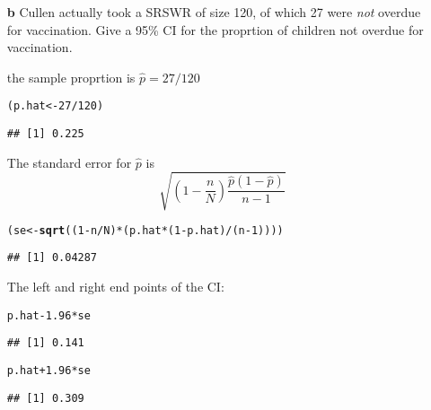 \documentclass{article}\usepackage{graphicx, color}
\makeatletter
\newcommand{\hlfunctioncall}[1]{\textcolor[rgb]{0.501960784313725,0,0.329411764705882}{\textbf{#1}}}%
\newenvironment{kframe}{%
 \def\at@end@of@kframe{}%
 \ifinner\ifhmode%
  \def\at@end@of@kframe{\end{minipage}}%
  \begin{minipage}{\columnwidth}%
 \fi\fi%
 \def\FrameCommand##1{\hskip\@totalleftmargin \hskip-\fboxsep
 \colorbox{shadecolor}{##1}\hskip-\fboxsep
     \hskip-\linewidth \hskip-\@totalleftmargin \hskip\columnwidth}%
 \MakeFramed {\advance\hsize-\width
   \@totalleftmargin\z@ \linewidth\hsize
   \@setminipage}}%
 {\par\unskip\endMakeFramed%
 \at@end@of@kframe}
\newenvironment{knitrout}{}{} %
\makeatother
\begin{document}
\begin{enumerate}
\begin{shaded}
\end{shaded}
\vfil
\pagebreak
\item[{\bf b}] Cullen actually took a SRSWR of size 120, of which
27 were {\sl not} overdue for vaccination. Give a 95\% CI for the
proprtion of children not overdue for vaccination.
\begin{shaded}
the sample proprtion is $\hat{p} = 27/120$
\begin{knitrout}
\color{fgcolor}\begin{kframe}
\begin{alltt}
(p.hat <- 27/120)
\end{alltt}
\begin{verbatim}
## [1] 0.225
\end{verbatim}
\end{kframe}
\end{knitrout}

The standard error for $\hat{p}$ is
$$
\sqrt{\left(1 - \frac{n}{N}\right)\frac{\hat{p}(1 - \hat{p})}{n-1}}
$$
\begin{knitrout}
\color{fgcolor}\begin{kframe}
\begin{alltt}
(se <- \hlfunctioncall{sqrt}((1 - n/N) * (p.hat * (1 - p.hat)/(n - 1))))
\end{alltt}
\begin{verbatim}
## [1] 0.04287
\end{verbatim}
\end{kframe}
\end{knitrout}

The left and right end points of the CI:
\begin{knitrout}
\color{fgcolor}\begin{kframe}
\begin{alltt}
p.hat - 1.96 * se
\end{alltt}
\begin{verbatim}
## [1] 0.141
\end{verbatim}
\begin{alltt}
p.hat + 1.96 * se
\end{alltt}
\begin{verbatim}
## [1] 0.309
\end{verbatim}
\end{kframe}
\end{knitrout}


\end{shaded}
\end{enumerate}
\end{document}

